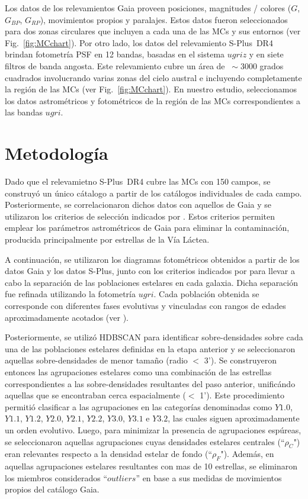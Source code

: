\documentclass[baaa]{baaa}
\begin{document}
Los datos de los relevamientos Gaia proveen posiciones, magnitudes / colores ($G$, $G_{BP}$, $G_{RP}$), movimientos propios y paralajes. Estos datos fueron seleccionados para dos zonas circulares que incluyen a cada una de las MCs y sus entornos (ver Fig.~\ref{fig:MCchart}). Por otro lado, los datos del relevamiento S-Plus~DR4 brindan fotometría PSF en 12 bandas, basadas en el sistema $ugriz$ y en siete filtros de banda angosta. Este relevamiento cubre un área de $~\sim$3000 grados cuadrados involucrando varias zonas del cielo austral e incluyendo completamente la región de las MCs (ver Fig.~\ref{fig:MCchart}). En nuestro estudio, seleccionamos los datos astrométricos y fotométricos de la región de las MCs correspondientes a las bandas $ugri$.

\section{Metodología}

Dado que el relevamietno S-Plus~DR4 cubre las MCs con 150 campos, se construyó un único cátalogo a partir de los catálogos individuales de cada campo. Posteriormente, se correlacionaron dichos datos con aquellos de Gaia y se utilizaron los criterios de selección indicados por \cite{GaiaCollaboration2021}. Estos criterios permiten emplear los parámetros astrométricos de Gaia para eliminar la contaminación, producida principalmente por estrellas de la Vía Láctea.

A continuación, se utilizaron los diagramas fotométricos obtenidos a partir de los datos Gaia y los datos S-Plus, junto con los criterios indicados por \cite{GaiaCollaboration2021} para llevar a cabo la separación de las poblaciones estelares en cada galaxia. Dicha separación fue refinada utilizando la fotometría $ugri$. Cada población obtenida se corresponde con diferentes fases evolutivas y vinculadas con rangos de edades aproximadamente acotados (ver \citealt{GaiaCollaboration2021}).

Posteriormente, se utilizó HDBSCAN \citep{McInnes2017} para identificar sobre-densidades sobre cada una de las poblaciones estelares definidas en la etapa anterior y se seleccionaron aquellas sobre-densidades de menor tamaño (radio $<$ 3'). Se construyeron entonces las agrupaciones estelares como una combinación de las estrellas correspondientes a las sobre-densidades resultantes del paso anterior, unificándo aquellas que se encontraban cerca espacialmente ($<$ 1’). Este procedimiento permitió clasificar a las agrupaciones en las categorías denominadas como $Y1.0$, $Y1.1$, $Y1.2$, $Y2.0$, $Y2.1$, $Y2.2$, $Y3.0$, $Y3.1$ e $Y3.2$, las cuales siguen aproximadamente un orden evolutivo. Luego, para minimizar la presencia de agrupaciones espúreas, se seleccionaron aquellas agrupaciones cuyas densidades estelares centrales (``$\rho_C$") eran relevantes respecto a la densidad estelar de fondo (``$\rho_F$"). Además, en aquellas agrupaciones estelares resultantes con mas de 10 estrellas, se eliminaron los miembros considerados ``$outliers$” en base a sus medidas de movimientos propios del catálogo Gaia.
\end{document}
